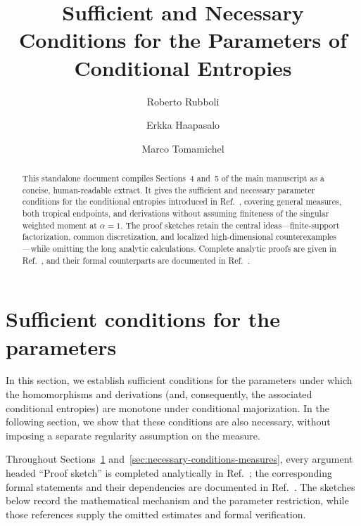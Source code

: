\documentclass[aps,pra,11pt,onecolumn,nofootinbib,tightenlines]{revtex4-2}
\theoremstyle{definition}
\begin{document}
\title{Sufficient and Necessary Conditions for the Parameters of Conditional Entropies}

\begin{abstract}
This standalone document compiles Sections~4 and~5 of the main manuscript as a
concise, human-readable extract.  It gives the sufficient and necessary parameter
conditions for the conditional entropies introduced in
Ref.~\cite{rubboli2026complete}, covering general measures, both tropical endpoints,
and derivations without assuming finiteness of the singular weighted moment at
$\alpha=1$.
The proof sketches retain the central ideas---finite-support factorization, common
discretization, and localized high-dimensional counterexamples---while omitting the
long analytic calculations.  Complete analytic proofs are given in
Ref.~\cite{rubboli2026parametersFull}, and their formal counterparts are documented in
Ref.~\cite{rubboli2026parametersLean}.
\end{abstract}

\author{Roberto Rubboli}
\noaffiliation
\author{Erkka Haapasalo}
\noaffiliation
\author{Marco Tomamichel}
\noaffiliation

\maketitle

\tableofcontents

\setcounter{section}{3}
\fi

\section{Sufficient conditions for the parameters}
\label{sec:sufficient-conditions-measure}

In this section, we establish sufficient conditions for the parameters under which the
homomorphisms and derivations (and, consequently, the associated conditional entropies)
are monotone under conditional majorization.  In the following section, we show that
these conditions are also necessary, without imposing a separate regularity assumption
on the measure.

Throughout Sections~\ref{sec:sufficient-conditions-measure}
and~\ref{sec:necessary-conditions-measures}, every argument headed ``Proof sketch''
is completed analytically in Ref.~\cite{rubboli2026parametersFull}; the corresponding
formal statements and their dependencies are documented in
Ref.~\cite{rubboli2026parametersLean}.  The sketches below record the mathematical
mechanism and the parameter restriction, while those references supply the omitted
estimates and formal verification.
\end{document}
